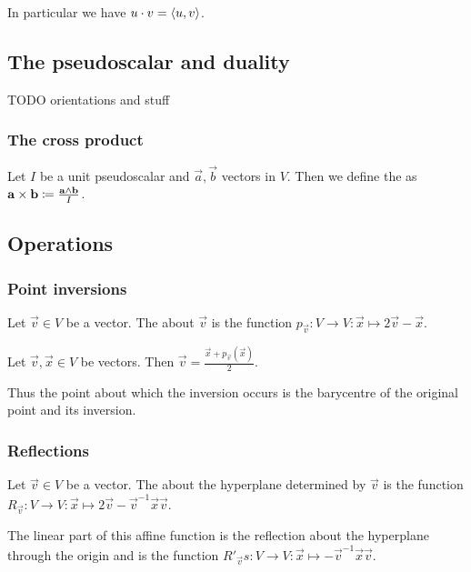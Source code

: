 In particular we have $u\cdot v = \inner{u,v}$.

\subsection{The pseudoscalar and duality}
TODO orientations and stuff

\subsubsection{The cross product}
\begin{definition}
Let $I$ be a unit pseudoscalar and $\vec{a},\vec{b}$ vectors in $V$. Then we define the  as $\boldsymbol{\mathrm{a}}\times\boldsymbol{\mathrm{b}} \coloneqq \frac{\boldsymbol{\mathrm{a}}\wedge \boldsymbol{\mathrm{b}}}{I}$.
\end{definition}

\subsection{Operations}
\subsubsection{Point inversions}
\begin{definition}
Let $\vec{v}\in V$ be a vector. The  about $\vec{v}$ is the function $p_{\vec{v}}: V\to V: \vec{x}\mapsto 2 \vec{v} - \vec{x}$.
\end{definition}

\begin{lemma}
Let $\vec{v}, \vec{x}\in V$ be vectors. Then $\vec{v} = \frac{\vec{x}+ p_{\vec{v}}(\vec{x})}{2}$.
\end{lemma}
Thus the point about which the inversion occurs is the barycentre of the original point and its inversion.

\subsubsection{Reflections}
\begin{definition}
Let $\vec{v}\in V$ be a vector. The  about the hyperplane determined by $\vec{v}$ is the function $R_{\vec{v}}: V\to V: \vec{x}\mapsto 2 \vec{v} - \vec{v}^{-1}\vec{x}\vec{v}$.

The linear part of this affine function is the reflection about the hyperplane through the origin and is the function $R'_{\vec{v}}s: V\to V: \vec{x}\mapsto - \vec{v}^{-1}\vec{x}\vec{v}$.
\end{definition}


